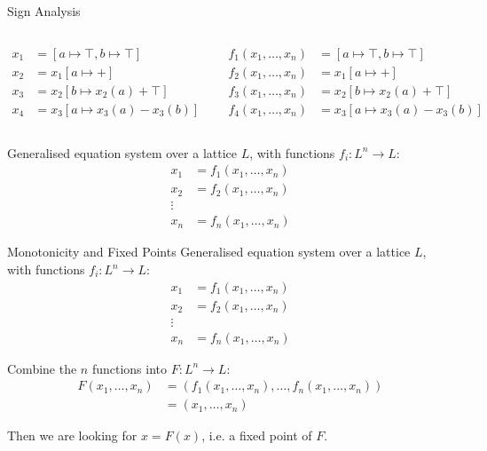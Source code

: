 \documentclass[aspectratio=169,xcolor=dvipsnames]{beamer}
\begin{document}
\begin{frame}[fragile]{Sign Analysis}
	\begin{columns}[c] %

		\begin{align*}
			x_1 & = [a \mapsto \top, b \mapsto \top] \\
			x_2 & = x_1[a \mapsto +]                 \\
			x_3 & = x_2[b \mapsto x_2(a) + \top]     \\
			x_4 & = x_3[a \mapsto x_3(a) - x_3(b)]
		\end{align*}

		\begin{align*}
			f_1(x_1, \ldots, x_n) & = [a \mapsto \top, b \mapsto \top] \\
			f_2(x_1, \ldots, x_n) & = x_1[a \mapsto +]                 \\
			f_3(x_1, \ldots, x_n) & = x_2[b \mapsto x_2(a) + \top]     \\
			f_4(x_1, \ldots, x_n) & = x_3[a \mapsto x_3(a) - x_3(b)]
		\end{align*}
	\end{columns} \bigskip

	Generalised equation system over a lattice $L$, with functions $f_i: L^n
		\rightarrow L$:
	\begin{align*}
		x_1 & = f_1(x_1, \ldots, x_n) \\
		x_2 & = f_2(x_1, \ldots, x_n) \\
		\vdots                        \\
		x_n & = f_n(x_1, \ldots, x_n)
	\end{align*}
\end{frame}


\begin{frame}{Monotonicity and Fixed Points}
	Generalised equation system over a lattice $L$, with functions $f_i: L^n
		\rightarrow L$:
	\begin{align*}
		x_1 & = f_1(x_1, \ldots, x_n) \\
		x_2 & = f_2(x_1, \ldots, x_n) \\
		\vdots                        \\
		x_n & = f_n(x_1, \ldots, x_n)
	\end{align*}

	Combine the $n$ functions into $F: L^n \rightarrow L$:
	\begin{align*}
		F(x_1, \ldots, x_n) & = (f_1(x_1, \ldots, x_n), \ldots, f_n(x_1, \ldots, x_n)) \\
		                    & = (x_1, \ldots, x_n)
	\end{align*}

	Then we are looking for $x = F(x)$, i.e. a fixed point of $F$.
\end{frame}
\end{document}
